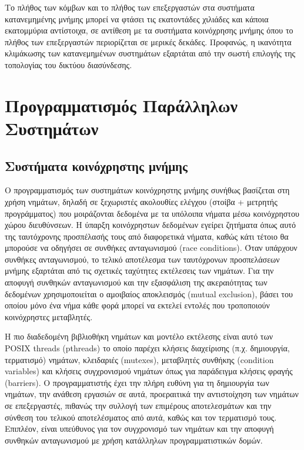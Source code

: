 Το πλήθος των κόμβων και το πλήθος των επεξεργαστών στα συστήματα κατανεμημένης μνήμης μπορεί να φτάσει τις εκατοντάδες χιλιάδες και κάποια εκατομμύρια αντίστοιχα, σε αντίθεση με τα συστήματα κοινόχρησης μνήμης όπου το πλήθος των επεξεργαστών περιορίζεται σε μερικές δεκάδες. Προφανώς, η ικανότητα κλιμάκωσης των κατανεμημένων συστημάτων εξαρτάται από την σωστή επιλογής της τοπολογίας του δικτύου διασύνδεσης.


\section{Προγραμματισμός Παράλληλων Συστημάτων}

\subsection{Συστήματα κοινόχρηστης μνήμης}
\label{ssec:Shared Memory Programming}
Ο προγραμματισμός των συστημάτων κοινόχρηστης μνήμης συνήθως βασίζεται στη χρήση νημάτων, δηλαδή σε ξεχωριστές ακολουθίες ελέγχου (στοίβα + μετρητής προγράμματος) που μοιράζονται δεδομένα με τα υπόλοιπα  νήματα μέσω κοινόχρηστου χώρου διευθύνσεων. Η ύπαρξη κοινόχρηστων δεδομένων εγείρει ζητήματα όπως αυτό της ταυτόχρονης προσπέλασής τους από διαφορετικά νήματα, καθώς κάτι τέτοιο θα μπορούσε να οδηγήσει σε συνθήκες ανταγωνισμού (race conditions). Όταν υπάρχουν συνθήκες ανταγωνισμού, το τελικό αποτέλεσμα των ταυτόχρονων προσπελάσεων μνήμης εξαρτάται από τις σχετικές ταχύτητες εκτέλεσεις των νημάτων. Για την αποφυγή συνθηκών ανταγωνισμού και την εξασφάλιση της ακεραιότητας των δεδομένων χρησιμοποιείται ο αμοιβαίος αποκλεισμός (mutual exclusion), βάσει του οποίου μόνο ένα νήμα κάθε φορά μπορεί να εκτελεί εντολές που τροποποιούν κοινόχρηστες μεταβλητές.

Η πιο διαδεδομένη βιβλιοθήκη νημάτων και μοντέλο εκτέλεσης είναι αυτό των POSIX threads (pthreads) το οποίο παρέχει κλήσεις διαχείρισης (π.χ. δημιουργία, τερματισμό) νημάτων, κλειδαριές (mutexes), μεταβλητές συνθήκης (condition variables) και κλήσεις συγχρονισμού νημάτων όπως για παράδειγμα κλήσεις φραγής (barriers). Ο προγραμματιστής έχει την πλήρη ευθύνη για τη δημιουργία των νημάτων, την ανάθεση εργασιών σε αυτά, προεραιτικά την αντιστοίχηση των νημάτων σε επεξεργαστές, πιθανώς την συλλογή των επιμέρους αποτελεσμάτων και την σύνθεση του τελικού αποτελέσματος από αυτά, καθώς και τον τερματισμό τους. Επιπλέον, είναι υπεύθυνος για τον συγχρονισμό των νημάτων και την αποφυγή συνθηκών ανταγωνισμού με χρήση κατάλληλων προγραμματιστικών δομών.

